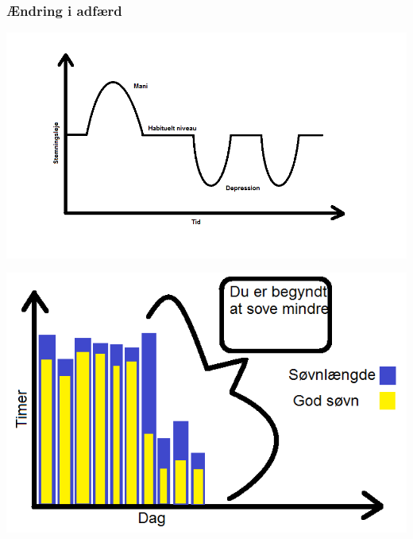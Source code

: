 \begin{frame}
\frametitle{Ændring i adfærd}

\begin{minipage}{0.54\linewidth}
	\includegraphics[scale=0.25]{affektivstemningsleje}
\end{minipage}
\begin{minipage}{0.45\linewidth}
	\includegraphics[scale=0.25]{soevnaendring}
\end{minipage}
\end{frame}